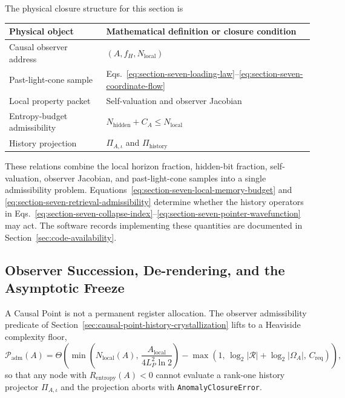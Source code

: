 \documentclass[11pt,letterpaper]{article}
\theoremstyle{plain}
\newcommand{\Lp}{L_P}
\newcommand{\Padm}{\mathcal P_{\text{adm}}}
\newcommand{\Rentropy}{R_{\text{entropy}}}
\begin{document}
The physical closure structure for this section is
\begin{center}
\begin{tabular}{@{}ll@{}}
\toprule
Physical object & Mathematical definition or closure condition \\
\midrule
Causal observer address & $(A,f_H,N_{\text{local}})$ \\
Past-light-cone sample & Eqs.~\eqref{eq:section-seven-loading-law}--\eqref{eq:section-seven-coordinate-flow} \\
Local property packet & Self-valuation and observer Jacobian \\
Entropy-budget admissibility & $N_{\text{hidden}}+C_A\le N_{\text{local}}$ \\
History projection & $\Pi_{A,\iota}$ and $\Pi_{\text{history}}$ \\
\bottomrule
\end{tabular}
\end{center}
These relations combine the local horizon fraction, hidden-bit fraction,
self-valuation, observer Jacobian, and past-light-cone samples into a single
admissibility problem.  Equations~\eqref{eq:section-seven-local-memory-budget}
and \eqref{eq:section-seven-retrieval-admissibility} determine whether the
history operators in
Eqs.~\eqref{eq:section-seven-collapse-index}--\eqref{eq:section-seven-pointer-wavefunction}
may act.  The software records implementing these quantities are documented in
Section~\ref{sec:code-availability}.

\subsection{Observer Succession, De-rendering, and the Asymptotic Freeze}
\label{sec:observer-succession}

A Causal Point is not a permanent register allocation.  The observer
admissibility predicate of
Section~\ref{sec:causal-point-history-crystallization} lifts to a Heaviside
complexity floor,
\begin{equation}
\label{eq:observer-admissibility-predicate}
 \boxed{
 \Padm(A)
 =
 \Theta\!\left(
 \min\!\left(
 N_{\text{local}}(A),\,
 \frac{A_{\text{local}}}{4\Lp^2\ln 2}
 \right)
 -
 \max\!\left(
 1,\,
 \log_2|\mathcal R|+\log_2|\Omega_A|,\,
 C_{\text{req}}
 \right)
 \right),
 }
\end{equation}
so that any node with $\Rentropy(A)<0$ cannot evaluate a rank-one history
projector $\Pi_{A,\iota}$ and the projection aborts with
\texttt{AnomalyClosureError}.
\end{document}
